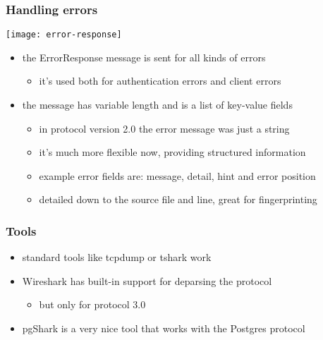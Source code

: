 \documentclass{beamer}
\begin{document}
\begin{frame}
  \frametitle{Handling errors}

  \begin{center}
    \texttt{[image: error-response]}
  \end{center}

  \begin{itemize}
  \item the ErrorResponse message is sent for all kinds of errors
    \begin{itemize}
    \item it's used both for authentication errors and client errors
    \end{itemize}
  \item the message has variable length and is a list of key-value fields
    \begin{itemize}
    \item in protocol version 2.0 the error message was just a string
    \item it's much more flexible now, providing structured information
    \item example error fields are: message, detail, hint and error position
    \item detailed down to the source file and line, great for fingerprinting
    \end{itemize}
  \end{itemize}
\end{frame}

\begin{frame}
  \frametitle{Tools}

  \begin{itemize}
    \item standard tools like tcpdump or tshark work
    \item Wireshark has built-in support for deparsing the protocol
      \begin{itemize}
      \item but only for protocol 3.0
      \end{itemize}
    \item pgShark is a very nice tool that works with the Postgres protocol
  \end{itemize}
\end{frame}
\end{document}
